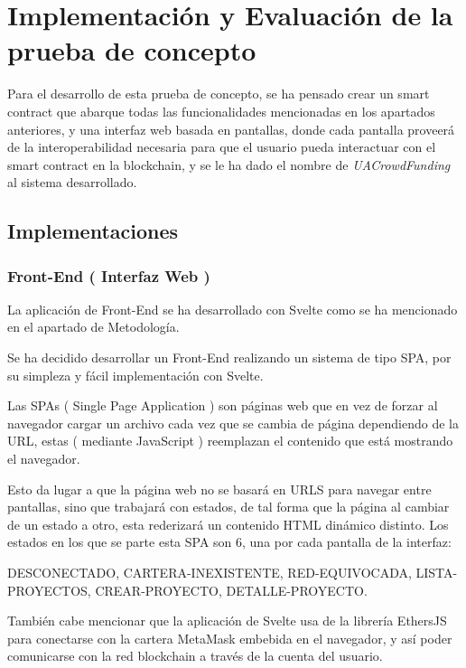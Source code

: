 \section{Implementación y Evaluación de la prueba de concepto}

Para el desarrollo de esta prueba de concepto, se ha pensado crear un smart contract que abarque todas las funcionalidades mencionadas en los apartados anteriores, y una interfaz web basada en pantallas, donde cada pantalla proveerá de la interoperabilidad necesaria para que el usuario pueda interactuar con el smart contract en la blockchain, y se le ha dado el nombre de \textit{UACrowdFunding} al sistema desarrollado.

\subsection{Implementaciones}

\subsubsection{Front-End ( Interfaz Web ) }

La aplicación de Front-End se ha desarrollado con Svelte como se ha mencionado en el apartado de Metodología. 

\bigskip

Se ha decidido desarrollar un Front-End realizando un sistema de tipo SPA, por su simpleza y fácil implementación con Svelte.

\bigskip

Las SPAs ( Single Page Application ) son páginas web que en vez de forzar al navegador cargar un archivo cada vez que se cambia de página dependiendo de la URL, estas ( mediante JavaScript ) reemplazan el contenido que está mostrando el navegador.

\bigskip

Esto da lugar a que la página web no se basará en URLS para navegar entre pantallas, sino que trabajará con estados, de tal forma que la página al cambiar de un estado a otro, esta rederizará un contenido HTML dinámico distinto. Los estados en los que se parte esta SPA son 6, una por cada pantalla de la interfaz: 

\bigskip

DESCONECTADO, CARTERA-INEXISTENTE, RED-EQUIVOCADA, LISTA-PROYECTOS, CREAR-PROYECTO, DETALLE-PROYECTO.

\bigskip

También cabe mencionar que la aplicación de Svelte usa de la librería EthersJS para conectarse con la cartera MetaMask embebida en el navegador, y así poder comunicarse con la red blockchain a través de la cuenta del usuario.

